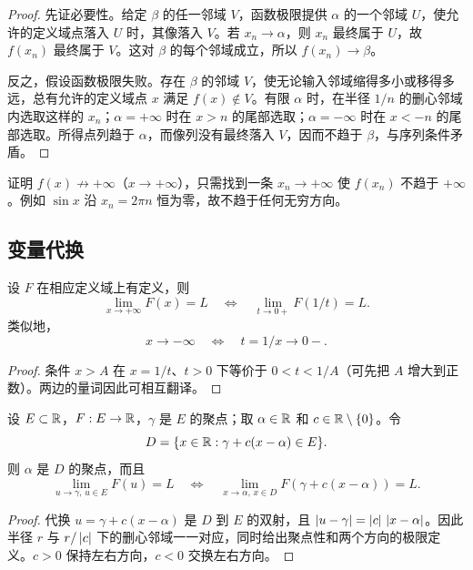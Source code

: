 \begin{proof}
先证必要性。给定 \(\beta\) 的任一邻域 \(V\)，函数极限提供 \(\alpha\) 的一个邻域 \(U\)，使允许的定义域点落入 \(U\) 时，其像落入 \(V\)。若 \(x_n\to\alpha\)，则 \(x_n\) 最终属于 \(U\)，故 \(f(x_n)\) 最终属于 \(V\)。这对 \(\beta\) 的每个邻域成立，所以 \(f(x_n)\to\beta\)。

反之，假设函数极限失败。存在 \(\beta\) 的邻域 \(V\)，使无论输入邻域缩得多小或移得多远，总有允许的定义域点 \(x\) 满足 \(f(x)\notin V\)。有限 \(\alpha\) 时，在半径 \(1/n\) 的删心邻域内选取这样的 \(x_n\)；\(\alpha=+\infty\) 时在 \(x>n\) 的尾部选取；\(\alpha=-\infty\) 时在 \(x<-n\) 的尾部选取。所得点列趋于 \(\alpha\)，而像列没有最终落入 \(V\)，因而不趋于 \(\beta\)，与序列条件矛盾。
\end{proof}

\begin{example}
证明 \(f(x)\not\to+\infty\)（\(x\to+\infty\)），只需找到一条 \(x_n\to+\infty\) 使 \(f(x_n)\) 不趋于 \(+\infty\)。例如 \(\sin x\) 沿 \(x_n=2\pi n\) 恒为零，故不趋于任何无穷方向。
\end{example}

\subsection{变量代换}

\begin{proposition}[倒数代换]
设 \(F\) 在相应定义域上有定义，则
\[
 \lim_{x\to+\infty}F(x)=L
 \quad\Longleftrightarrow\quad
 \lim_{t\to0+}F(1/t)=L.
\]
类似地，
\[
 x\to-\infty\quad\Longleftrightarrow\quad t=1/x\to0-.
\]
\end{proposition}

\begin{proof}
条件 \(x>A\) 在 \(x=1/t\)、\(t>0\) 下等价于 \(0<t<1/A\)（可先把 \(A\) 增大到正数）。两边的量词因此可相互翻译。
\end{proof}

\begin{proposition}[平移与尺度代换]
设 \(E\subset\mathbb{R}\)，\(F:E\to\mathbb{R}\)，\(\gamma\) 是 \(E\) 的聚点；取 \(\alpha\in\mathbb{R}\) 和 \(c\in\mathbb{R}\setminus\{0\}\)。令
\[
 D=\{x\in\mathbb{R}:\gamma+c(x-\alpha)\in E\}.
\]
则 \(\alpha\) 是 \(D\) 的聚点，而且
\[
 \lim_{u\to\gamma,\,u\in E}F(u)=L
 \quad\Longleftrightarrow\quad
 \lim_{x\to\alpha,\,x\in D}F(\gamma+c(x-\alpha))=L.
\]
\end{proposition}

\begin{proof}
代换 \(u=\gamma+c(x-\alpha)\) 是 \(D\) 到 \(E\) 的双射，且
\(\left|u-\gamma\right|=\left|c\right|\,\left|x-\alpha\right|\)。因此半径 \(r\) 与 \(r/\left|c\right|\) 下的删心邻域一一对应，同时给出聚点性和两个方向的极限定义。\(c>0\) 保持左右方向，\(c<0\) 交换左右方向。
\end{proof}

